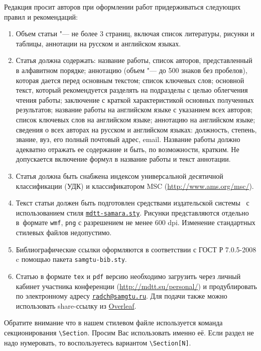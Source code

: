 Редакция просит авторов при оформлении работ придерживаться следующих правил и рекомендаций:
\begin{enumerate}
\item  Объем статьи "--- не более 3 страниц, включая список литературы, рисунки и таблицы, аннотации на русском и английском языках.
\item Статья должна содержать: название работы, список авторов, представленный в алфавитном порядке; аннотацию (объем "--- до 500 знаков без пробелов), которая дается перед основным текстом; список ключевых слов; основной текст, который рекомендуется разделять на подразделы с целью облегчения чтения работы; заключение с краткой характеристикой основных полученных результатов; название работы на английском языке с указанием всех авторов; список ключевых слов на английском языке; аннотацию на английском языке; сведения о всех авторах на русском и английском языках: должность, степень, звание, вуз, его полный почтовый адрес, email. Название работы должно адекватно отражать ее содержание и быть, по возможности, кратким. Не допускается включение формул в название работы и текст аннотации.
\item Статья должна быть снабжена индексом универсальной десятичной классификации (УДК) и классификатором MSC (\url{http://www.ams.org/msc/}).
\item Текст статьи должен быть подготовлен средствами издательской системы \LaTeXe\ с использованием стиля \href{https://www.overleaf.com/read/dknkxrfwrdsw}{\tt mdtt-samara.sty}. 
Рисунки представляются отдельно в~формате {\tt wmf}, {\tt png} с разрешением не менее 600 dpi. 
Изменение стандартных стилевых файлов недопустимо.
\item Библиографические ссылки оформляются в соответствии с ГОСТ Р 7.0.5-2008  c помощью пакета {\tt samgtu-bib.sty}. 
\item Статью в формате {\tt tex} и {\tt pdf} версию необходимо загрузить через личный кабинет участника конференции (\url{http://mdtt.su/personal/}) и продублировать по электронному адресу \href{mailto:radch@samgtu.ru}{\tt radch@samgtu.ru}. 
Для подачи также можно использовать share-ссылку из \href{https://www.overleaf.com/}{Overleaf}.

\end{enumerate}


Обратите внимание что в нашем стилевом файле используется команда секционирования \verb"\Section". 
Просим Вас  использовать именно её. 
Если раздел не надо нумеровать, то воспользуетесь вариантом \verb"\Section[N]".


